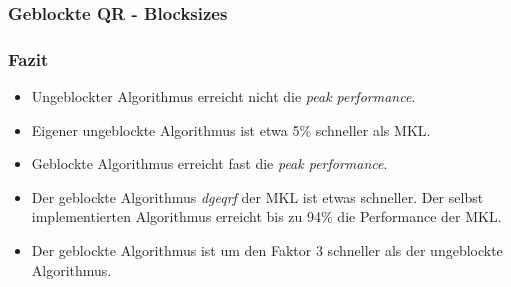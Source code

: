 \begin{frame}
\frametitle{Geblockte QR - Blocksizes}
	\centering
\end{frame}

\begin{frame}
\frametitle{Fazit}
\centering
\begin{itemize}
	\item Ungeblockter Algorithmus erreicht nicht die \textit{peak performance}.
	\item Eigener ungeblockte Algorithmus ist etwa 5\% schneller als MKL.
	\item Geblockte Algorithmus erreicht fast die \textit{peak performance}.
	\item Der geblockte Algorithmus \textit{dgeqrf} der MKL ist etwas schneller. Der selbst implementierten Algorithmus erreicht bis zu 94\% die Performance der MKL.
	\item Der geblockte Algorithmus ist um den Faktor 3 schneller als der ungeblockte Algorithmus.
\end{itemize}
\end{frame}




